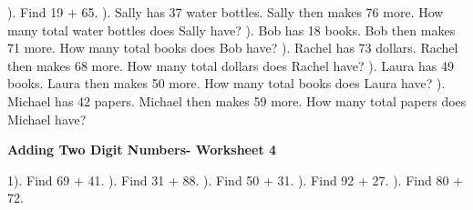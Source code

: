 \documentclass{article}%
\begin{document}
\newline%
\newline%
). Find 19 + 65.%
\newline%
\newline%
). Sally has 37 water bottles. Sally then makes 76 more. How many total water bottles does Sally have?%
\newline%
\newline%
). Bob has 18 books. Bob then makes 71 more. How many total books does Bob have?%
\newline%
\newline%
). Rachel has 73 dollars. Rachel then makes 68 more. How many total dollars does Rachel have?%
\newline%
\newline%
). Laura has 49 books. Laura then makes 50 more. How many total books does Laura have?%
\newline%
\newline%
). Michael has 42 papers. Michael then makes 59 more. How many total papers does Michael have?%
\newline%
\newline%
\newline%
\pagebreak%
\large%
\begin{center}%
\textbf{Adding Two Digit Numbers- Worksheet 4}%
\newline%
\end{center} \normalsize%
1). Find 69 + 41.%
\newline%
\newline%
). Find 31 + 88.%
\newline%
\newline%
). Find 50 + 31.%
\newline%
\newline%
). Find 92 + 27.%
\newline%
\newline%
). Find 80 + 72.%
\newline%
\newline%
\newline%
\end{document}
